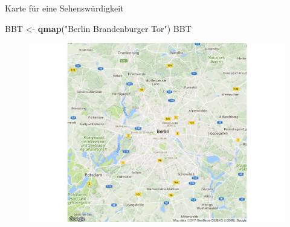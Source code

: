 \documentclass[ignorenonframetext,]{beamer}
\newenvironment{Shaded}{}{}
\newcommand{\KeywordTok}[1]{\textcolor[rgb]{0.00,0.44,0.13}{\textbf{{#1}}}}
\newcommand{\StringTok}[1]{\textcolor[rgb]{0.25,0.44,0.63}{{#1}}}
\newcommand{\NormalTok}[1]{{#1}}
\begin{document}
\begin{frame}[fragile]{Karte für eine Sehenswürdigkeit}

\begin{Shaded}
\begin{Highlighting}[]
\NormalTok{BBT <-}\StringTok{ }\KeywordTok{qmap}\NormalTok{(}\StringTok{"Berlin Brandenburger Tor"}\NormalTok{)}
\NormalTok{BBT}
\end{Highlighting}
\end{Shaded}

\begin{figure}[htbp]
\centering
\includegraphics{RSocialScience2_files/figure-beamer/unnamed-chunk-28-1.pdf}
\caption{}
\end{figure}

\end{frame}
\end{document}
